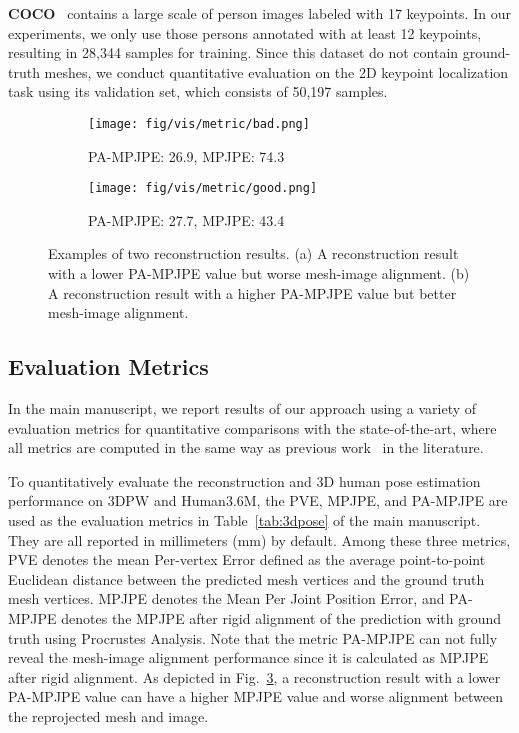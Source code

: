 \documentclass[10pt,twocolumn,letterpaper]{article}
\begin{document}
\textbf{COCO}~\cite{lin2014microsoft} contains a large scale of person images labeled with 17 keypoints.
In our experiments, we only use those persons annotated with at least 12 keypoints, resulting in 28,344 samples for training.
Since this dataset do not contain ground-truth meshes, we conduct quantitative evaluation on the 2D keypoint localization task using its validation set, which consists of 50,197 samples.


\begin{figure}[ht]
	\centering
	\begin{subfigure}[b]{0.23\textwidth}
		\texttt{[image: fig/vis/metric/bad.png]}
		\caption{\scriptsize PA-MPJPE: 26.9, MPJPE: 74.3}
		\label{fig:bad}
    \end{subfigure}
	\begin{subfigure}[b]{0.23\textwidth}
		\texttt{[image: fig/vis/metric/good.png]}
		\caption{\scriptsize PA-MPJPE: 27.7, MPJPE: 43.4}
		\label{fig:good}
    \end{subfigure}
    \vspace{-2mm}
	\caption{Examples of two reconstruction results. (a) A reconstruction result with a lower PA-MPJPE value but worse mesh-image alignment. (b) A reconstruction result with a higher PA-MPJPE value but better mesh-image alignment.}
	\label{fig:metrics}
\end{figure}


\subsection{Evaluation Metrics}
\label{sec:metric}
In the main manuscript, we report results of our approach using a variety of evaluation metrics for quantitative comparisons with the state-of-the-art, where all metrics are computed in the same way as previous work~\cite{kanazawa2018end,pavlakos2018learning,kolotouros2019learning} in the literature.

To quantitatively evaluate the reconstruction and 3D human pose estimation performance on 3DPW and Human3.6M, the PVE, MPJPE, and PA-MPJPE are used as the evaluation metrics in Table~\ref{tab:3dpose} of the main manuscript.
They are all reported in millimeters (mm) by default.
Among these three metrics, PVE denotes the mean Per-vertex Error defined as the average point-to-point Euclidean distance between the predicted mesh vertices and the ground truth mesh vertices.
MPJPE denotes the Mean Per Joint Position Error, and PA-MPJPE denotes the MPJPE after rigid alignment of the prediction with ground truth using Procrustes Analysis.
Note that the metric PA-MPJPE can not fully reveal the mesh-image alignment performance since it is calculated as MPJPE after rigid alignment.
As depicted in Fig.~\ref{fig:metrics}, a reconstruction result with a lower PA-MPJPE value can have a higher MPJPE value and worse alignment between the reprojected mesh and image.
\end{document}
